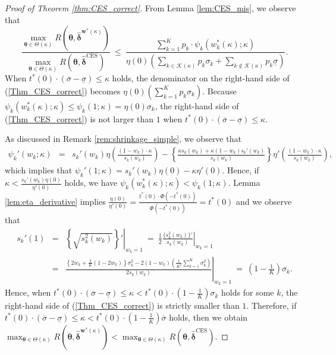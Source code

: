 \documentclass[12pt,a4paper]{article}
\begin{document}
\begin{proof}[Proof of Theorem \ref{thm:CES_correct}]
From Lemma \ref{lem:CES_mis}, we observe that
\begin{equation}
\frac{\max_{\bm{\theta} \in \Theta(\kappa)} R(\bm{\theta},\hat{\bm{\delta}}^{\bm{w}^{\ast}(\kappa)})}{\max_{\bm{\theta} \in \Theta(\kappa)} R(\bm{\theta},\hat{\bm{\delta}}^{\mathrm{CES}})} \ \leq \ \frac{\sum_{k=1}^K p_k \cdot \psi_k\left( w_k^{\ast}(\kappa) ;\kappa \right)}{\eta(0) \left( \sum_{k \in \mathcal{K}(\kappa)} p_k \sigma_k + \sum_{k \not\in \mathcal{K}(\kappa)} p_k \underline{\sigma} \right)}. \label{Thm_CES_correct}
\end{equation}
When $t^{\ast}(0) \cdot (\overline{\sigma} - \underline{\sigma}) \leq \kappa$ holds, the denominator on the right-hand side of (\ref{Thm_CES_correct}) becomes $\eta(0) \left( \sum_{k=1}^K p_k \sigma_k \right)$. Because $\psi_k\left( w_k^{\ast}(\kappa) ;\kappa \right) \leq \psi_k (1;\kappa) = \eta(0) \sigma_k$, the right-hand side of (\ref{Thm_CES_correct}) is not larger than $1$ when $t^{\ast}(0) \cdot (\overline{\sigma} - \underline{\sigma}) \leq \kappa$.

As discussed in Remark \ref{rem:shrinkage_simple}, we observe that
\begin{eqnarray*}
\psi_k'(w_k;\kappa) &=& s_k'(w_k) \eta \left( \frac{(1-w_k) \cdot \kappa}{s_k(w_k)} \right) - \left\{ \frac{\kappa s_k(w_k) + \kappa (1-w_k) s_k'(w_k)}{s_k(w_k)} \right\} \eta'\left( \frac{(1-w_k) \cdot \kappa}{s_k(w_k)} \right),
\end{eqnarray*}
which implies that $\psi_k'(1;\kappa) = s_k'(w_k) \eta(0) - \kappa \eta'(0)$. Hence, if $\kappa < \frac{s_k'(w_k) \eta(0)}{\eta'(0)}$ holds, we have $\psi_k\left( w_k^{\ast}(\kappa) ;\kappa \right) < \psi_k (1;\kappa)$. Lemma \ref{lem:eta_derivative} implies $\frac{\eta(0)}{\eta'(0)} = \frac{t^{\ast}(0) \cdot \Phi(-t^{\ast}(0))}{\Phi(-t^{\ast}(0))} = t^{\ast}(0)$ and we observe that
\begin{eqnarray*}
s_k'(1) &=& \left. \left\{ \sqrt{s_k^2(w_k)} \right\}' \right|_{w_k=1} \ = \ \left. \frac{1}{2} \frac{\{s_k^2(w_k)\}'}{s_k(w_k)} \right|_{w_k=1}\\
&=& \left. \frac{\left\{ 2 w_k + \frac{2}{K}(1-2w_k) \right\}\sigma_k^2 - 2(1-w_k) \left( \frac{1}{K^2} \sum_{k=1}^K \sigma_k^2 \right) }{2 s_k(w_k)} \right|_{w_k=1} \ = \ \left( 1 - \frac{1}{K} \right) \sigma_k.
\end{eqnarray*}
Hence, when $t^{\ast}(0) \cdot (\overline{\sigma} - \underline{\sigma}) \leq \kappa < t^{\ast}(0) \cdot \left( 1 - \frac{1}{K} \right) \sigma_k$ holds for some $k$, the right-hand side of (\ref{Thm_CES_correct}) is strictly smaller than $1$. Therefore, if $t^{\ast}(0) \cdot (\overline{\sigma} - \underline{\sigma}) \leq \kappa < t^{\ast}(0) \cdot \left( 1-\frac{1}{K} \right) \overline{\sigma}$ holds, then we obtain $\max_{\bm{\theta} \in \Theta(\kappa)} R(\bm{\theta},\hat{\bm{\delta}}^{\bm{w}^{\ast}(\kappa)}) < \max_{\bm{\theta} \in \Theta(\kappa)} R(\bm{\theta},\hat{\bm{\delta}}^{\mathrm{CES}})$.


\end{proof}
\end{document}
